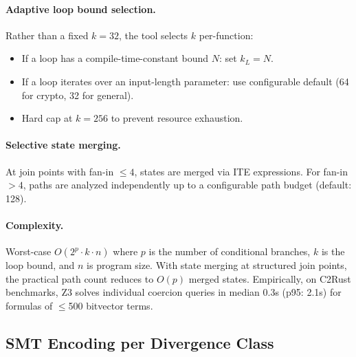\documentclass[11pt]{article}
\begin{document}
\paragraph{Adaptive loop bound selection.}
Rather than a fixed $k=32$, the tool selects $k$ per-function:
\begin{itemize}
  \item If a loop has a compile-time-constant bound $N$: set $k_L = N$.
  \item If a loop iterates over an input-length parameter: use configurable default (64 for crypto, 32 for general).
  \item Hard cap at $k = 256$ to prevent resource exhaustion.
\end{itemize}

\paragraph{Selective state merging.}
At join points with fan-in $\leq 4$, states are merged via ITE expressions. For fan-in $> 4$, paths are analyzed independently up to a configurable path budget (default: 128).

\paragraph{Complexity.} Worst-case $O(2^p \cdot k \cdot n)$ where $p$ is the number of conditional branches, $k$ is the loop bound, and $n$ is program size. With state merging at structured join points, the practical path count reduces to $O(p)$ merged states. Empirically, on C2Rust benchmarks, Z3 solves individual coercion queries in median 0.3s (p95: 2.1s) for formulas of $\leq$500 bitvector terms.


\subsection{SMT Encoding per Divergence Class}
\label{sec:alg-smt}
\end{document}
